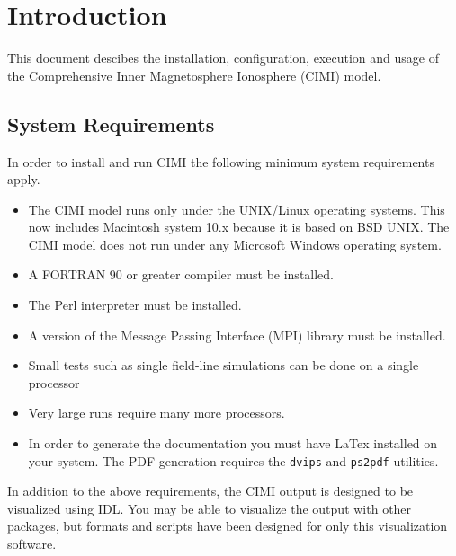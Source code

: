 
\chapter{Introduction}

This document descibes the installation, configuration, execution and 
usage of the Comprehensive Inner Magnetosphere Ionosphere (CIMI) model.





\section{System Requirements}

In order to install and run CIMI the following minimum system
requirements apply.

\begin{itemize}
\item The CIMI model runs only under the UNIX/Linux operating systems.  This now
  includes Macintosh system 10.x because it is based on BSD UNIX.  The
  CIMI model does not run under any Microsoft Windows operating system.
\item A FORTRAN 90 or greater compiler must be installed.
\item The Perl interpreter must be installed.
\item A version of the Message Passing Interface (MPI) library must be
  installed.
\item Small tests such as single  field-line simulations can be done on a 
  single processor
\item Very large runs require many more processors.
\item In order to generate the documentation you must have LaTex installed on
your system.  The PDF generation requires the {\tt dvips} and {\tt ps2pdf}
utilities. 

\end{itemize}


In addition to the above requirements, the CIMI output is designed to
be visualized using IDL.  You may be able to
visualize the output with other packages, but formats and scripts have
been designed for only this visualization software.


